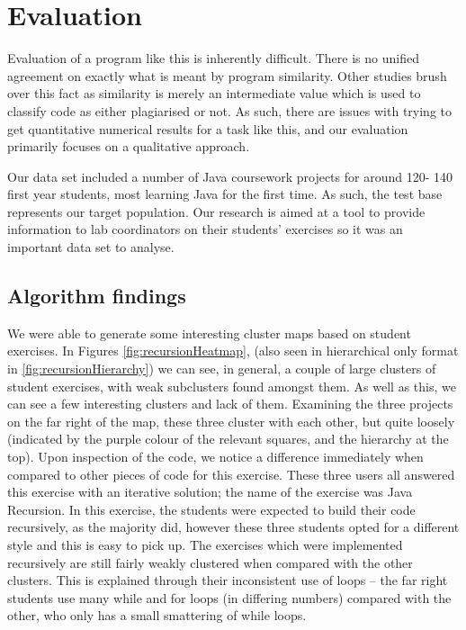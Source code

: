 \chapter{Evaluation}
\label{Evaluation}

Evaluation of a program like this is inherently difficult. There is no unified
agreement on exactly what is meant by program similarity. Other studies brush
over this fact as similarity is merely an intermediate value which is used 
to classify code as either plagiarised or not. As such, there are
issues with trying to get quantitative numerical results for a task like this,
and our evaluation primarily focuses on a qualitative approach.

Our data set included a number of Java coursework projects for around 120-
140 first year students, most learning Java for the first time. As such,
the test base represents our target population. Our research is aimed
at a tool to provide information to lab coordinators on their students'
exercises so it was an important data set to analyse.

\section{Algorithm findings}

We were able to generate some interesting cluster maps based on student exercises.
In Figures \ref{fig:recursionHeatmap}, (also seen in hierarchical only format in
\cref{fig:recursionHierarchy}) we can
see, in general, a couple of large clusters of student exercises, with weak
subclusters found amongst them. As well as this, we can see a few interesting
clusters and lack of them. Examining the three projects on the far right
of the map, these three cluster with each other, but quite loosely (indicated by
the purple colour of the relevant squares, and the hierarchy at the top).
Upon inspection of the code, we notice a difference immediately when compared
to other pieces of code for this exercise. These three users all answered this
exercise with an iterative solution; the name of the exercise was Java Recursion.
In this exercise, the students were expected to build their code recursively,
as the majority did, however these three students opted for a different style
and this is easy to pick up. The exercises which were implemented recursively
are still fairly weakly clustered when compared with the other clusters. This
is explained through their inconsistent use of loops -- the far right students
use many while and for loops (in differing numbers) compared with the other,
who only has a small smattering of while loops.


